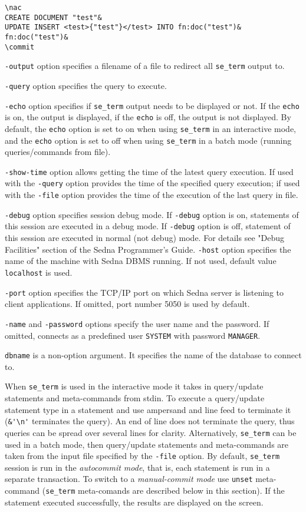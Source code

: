 \documentclass[a4paper,12pt]{article}
\begin{document}
\begin{verbatim}
\nac
CREATE DOCUMENT "test"&
UPDATE INSERT <test>{"test"}</test> INTO fn:doc("test")&
fn:doc("test")&
\commit
\end{verbatim}

\verb!-output! option specifies a filename of a file to redirect all \verb!se_term! output to.

\verb!-query! option specifies the query to execute.

\verb!-echo! option specifies if \verb!se_term! output needs to be displayed or not. If the \verb!echo! is on, the output is displayed, if the \verb!echo! is off, the output is not displayed. By default, the \verb!echo! option is set to on when using \verb!se_term! in an interactive mode, and the \verb!echo! option is set to off when using \verb!se_term! in a batch mode (running queries/commands from file).

\verb!-show-time! option allows getting the time of the latest query execution. If used with the \verb!-query! option provides the time of the specified query execution; if used with the \verb!-file! option provides the time of the execution of the last query in file.

\verb!-debug! option specifies session debug mode. If \verb!-debug! option is on, statements of this session are executed in a debug mode. If \verb!-debug! option is off, statement of this session are executed in normal (not debug) mode. For details see "Debug Facilities" section of the Sedna Programmer's Guide.
\verb!-host! option specifies the name of the machine with Sedna DBMS running. If not used, default value \verb!localhost! is used.

\verb!-port! option specifies the TCP/IP port on which Sedna server is listening to client applications. If omitted, port number 5050 is used by default.

\verb!-name! and \verb!-password! options specify the user name and the password. If omitted, connects as a predefined user \verb!SYSTEM! with password \verb!MANAGER!.

\verb!dbname! is a non-option argument. It specifies the name of the database to connect to.

When \verb!se_term! is used in the interactive mode it takes in query/update statements and meta-commands from stdin. To execute a query/update statement type in a statement and use ampersand and line feed to terminate it (\verb!&'\n'! terminates the query). An end of line does not terminate the query, thus queries can be spread over several lines for clarity. Alternatively, \verb!se_term! can be used in a batch mode, then query/update statements and meta-commands are taken from the input file specified by the \verb!-file! option. By default, \verb!se_term! session is run in the \emph{autocommit mode}, that is, each statement is run in a separate transaction. To switch to a \emph{manual-commit mode} use \verb!unset! meta-command (\verb!se_term! meta-comands are described below in this section). If the statement executed successfully, the results are displayed on the screen.
\end{document}
